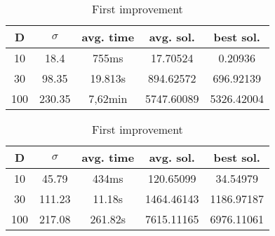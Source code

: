 \documentclass{article}
\begin{document}
\begin{table}[htbp]
\begin{minipage}{.4\linewidth}
    \centering

    \begin{tabular}{|c|c|c|c|c|}
    \hline
    D   & $\sigma$  & avg. time     & avg. sol.     & best sol. \\
    \hline
    10  & 18.4      & 755ms         & 17.70524      & 0.20936 \\
    \hline
    30  & 98.35     & 19.813s       & 894.62572     & 696.92139 \\
    \hline
    100 & 230.35    & 7,62min       & 5747.60089    & 5326.42004 \\
    \hline
    \end{tabular}
    \caption{Best improvement}
  \end{minipage}%
  \quad %
  \begin{minipage}{.75\linewidth}
    \centering

    \begin{tabular}{|c|c|c|c|c|}
    \hline
    D   & $\sigma$  & avg. time     & avg. sol.     & best sol. \\
    \hline
    10  & 45.79     & 434ms         & 120.65099     & 34.54979 \\
    \hline
    30  & 111.23    & 11.18s        & 1464.46143    & 1186.97187 \\
    \hline
    100 & 217.08    & 261.82s       & 7615.11165    & 6976.11061 \\
    \hline
    \end{tabular}
    \caption{First improvement}
  \end{minipage}
\end{table}
\end{document}
